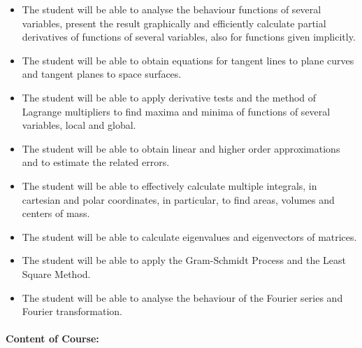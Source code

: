 \begin{itemize}
\item The student will be able to analyse the behaviour functions of several variables, present the result graphically and efficiently calculate partial derivatives of functions of several variables, also for functions given implicitly.
\item The student will be able to obtain equations for tangent lines to plane curves and tangent planes to space surfaces.
\item The student will be able to apply derivative tests and the method of Lagrange multipliers to find maxima and minima of functions of several variables, local and global.
\item The student will be able to obtain linear and higher order approximations and to estimate the related errors.
\item The student will be able to effectively calculate multiple integrals, in cartesian and polar coordinates, in particular, to find areas, volumes and centers of mass.
\item The student will be able to calculate eigenvalues and eigenvectors of matrices.
\item The student will be able to apply the Gram-Schmidt Process and the Least Square Method.
\item The student will be able to analyse the behaviour of the Fourier series and Fourier transformation.
\end{itemize}

\paragraph{Content of Course:}

